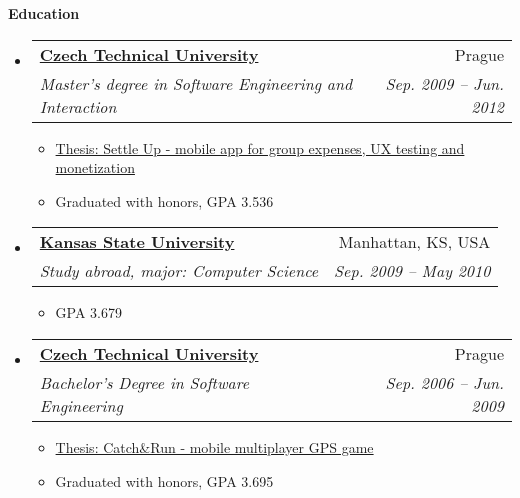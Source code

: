 \documentclass[letterpaper,11pt]{article}
\makeatletter
\newcommand{\resitem}[1]{\item #1 \vspace{-2pt}}
\newcommand{\resheading}[1]{{\large \colorbox{mygrey}{\begin{minipage}{\textwidth}{\textbf{#1 \vphantom{p\^{E}}}}\end{minipage}}}}
\newcommand{\ressubheading}[4]{
\begin{tabular*}{6.5in}{l@{\extracolsep{\fill}}r}
		\textbf{#1} & #2 \\
		\textit{#3} & \textit{#4} \\
\end{tabular*}\vspace{-6pt}}
\makeatother
\begin{document}
	\newpage
\resheading{Education}
	\begin{itemize}
		\item
			\ressubheading{\href{http://www.cvut.cz/en?set_language=en}{Czech Technical University}}{Prague}{Master's degree in Software Engineering and Interaction}{Sep. 2009 -- Jun. 2012}
				{ \footnotesize
				\begin{itemize}
					\resitem{\href{http://www.settleup.info/files/master-thesis-david-vavra.pdf}{Thesis: Settle Up - mobile app for group expenses, UX testing and monetization}}
					\resitem{Graduated with honors, GPA 3.536}
				\end{itemize}
				}
		\item
			\ressubheading{\href{http://www.k-state.edu}{Kansas State University}}{Manhattan, KS, USA}{Study abroad, major: Computer Science}{Sep. 2009 -- May 2010}
{ \footnotesize
				\begin{itemize}
					\resitem{GPA 3.679}
				\end{itemize}
				}
		\item   															%
			\ressubheading{\href{http://www.cvut.cz/en?set_language=en}{Czech Technical University}}{Prague}{Bachelor's Degree in Software Engineering}{Sep. 2006 -- Jun. 2009}
				{ \footnotesize
				\begin{itemize}
					\resitem{\href{http://www.destil.cz/bachelor-thesis-david-vavra.pdf}{Thesis: Catch\&Run - mobile multiplayer GPS game}}
					\resitem{Graduated with honors, GPA 3.695}
				\end{itemize}
				}
	\end{itemize} %
	
\end{document}
